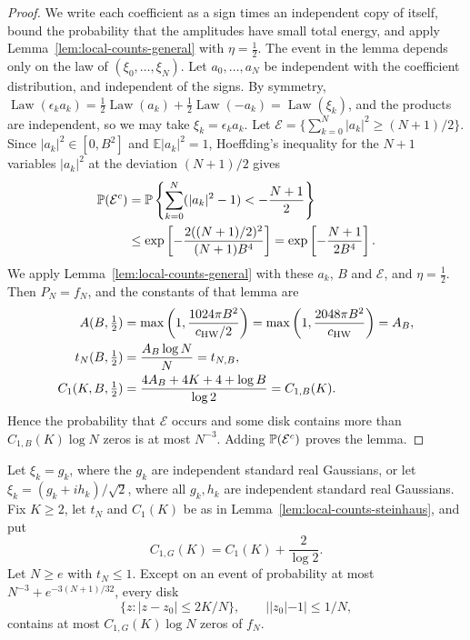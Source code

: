 \begin{proof}
We write each coefficient as a sign times an independent copy of itself,
bound the probability that the amplitudes have small total energy, and
apply Lemma~\ref{lem:local-counts-general} with $\eta=\tfrac12$.
The event in the lemma depends only on the law of
$(\xi_0,\dots,\xi_N)$.
Let $a_0,\dots,a_N$ be independent with the coefficient distribution, and
independent of the signs.
By symmetry,
$\operatorname{Law}(\epsilon_ka_k)
 =\tfrac12\operatorname{Law}(a_k)+\tfrac12\operatorname{Law}(-a_k)
 =\operatorname{Law}(\xi_k)$,
and the products are independent, so we may take $\xi_k=\epsilon_ka_k$.
Let $\mathcal E=\{\sum_{k=0}^N|a_k|^2\ge(N+1)/2\}$.
Since $|a_k|^2\in[0,B^2]$ and $\mathbb E|a_k|^2=1$, Hoeffding's
inequality \cite[Theorem~2]{Hoeffding1963} for the $N+1$ variables
$|a_k|^2$ at the deviation $(N+1)/2$ gives
\begin{align*}
 \mathbb P(\mathcal E^c)
 &=\mathbb P\left\{\sum_{k=0}^N(|a_k|^2-1)<-\frac{N+1}2\right\}\\
 &\le\exp\left[-\frac{2((N+1)/2)^2}{(N+1)B^4}\right]
 =\exp\left[-\frac{N+1}{2B^4}\right].
\end{align*}
We apply Lemma~\ref{lem:local-counts-general} with these $a_k$, $B$
and $\mathcal E$, and $\eta=\tfrac12$.
Then $P_N=f_N$, and the constants of that lemma are
\begin{align*}
 A(B,\tfrac12)&=\max\left(1,\frac{1024\pi B^2}{c_{\rm HW}/2}\right)
 =\max\left(1,\frac{2048\pi B^2}{c_{\rm HW}}\right)=A_B,\\
 t_N(B,\tfrac12)&=\frac{A_B\log N}N=t_{N,B},\\
 C_1(K,B,\tfrac12)&=\frac{4A_B+4K+4+\log B}{\log2}=C_{1,B}(K).
\end{align*}
Hence the probability that $\mathcal E$ occurs and some disk contains
more than $C_{1,B}(K)\log N$ zeros is at most $N^{-3}$.
Adding $\mathbb P(\mathcal E^c)$ proves the lemma.
\end{proof}

\begin{lemma}
\label{lem:local-counts-gauss}
Let $\xi_k=g_k$, where the $g_k$ are independent standard real
Gaussians, or let $\xi_k=(g_k+ih_k)/\sqrt2$, where all $g_k,h_k$ are
independent standard real Gaussians.
Fix $K\ge2$, let $t_N$ and $C_1(K)$ be as in
Lemma~\ref{lem:local-counts-steinhaus}, and put
\[
 C_{1,G}(K)=C_1(K)+\frac2{\log2}.
\]
Let $N\ge e$ with $t_N\le1$.
Except on an event of probability at most $N^{-3}+e^{-3(N+1)/32}$,
every disk
\[
 \{z:|z-z_0|\le2K/N\},\qquad ||z_0|-1|\le1/N,
\]
contains at most $C_{1,G}(K)\log N$ zeros of $f_N$.
\end{lemma}

